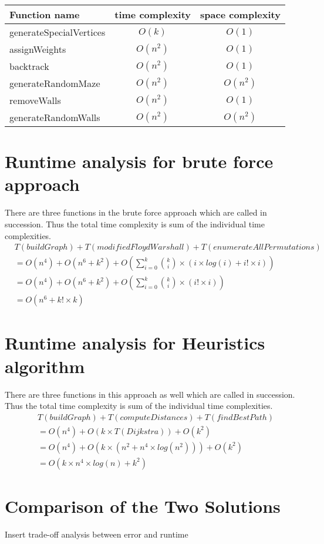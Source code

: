 \documentclass[12pt]{report}
\begin{document}
\begin{center}
\begin{tabular}{ |l||c|c| } 
 \hline
 Function name & time complexity &space complexity \\ 
 \hline\hline
 generateSpecialVertices & $O(k)$  & $O(1)$\\
 \hline
 assignWeights & $O(n^2)$& $O(1)$\\ 
 \hline
 backtrack & $O(n^2)$  & $O(1)$\\
 \hline
 generateRandomMaze & $O(n^2)$ & $O(n^2)$ \\ 
 \hline
 removeWalls & $O(n^2)$ & $O(1)$\\ %
 \hline
 generateRandomWalls & $O(n^2)$ & $O(n^2)$ \\ %
 \hline
 
\end{tabular}
\end{center}


\section{Runtime analysis for brute force approach}
There are three functions in the brute force approach which are called in succession. Thus the total time complexity is sum of the individual time complexities.
\begin{equation}
\begin{aligned}
    &T({buildGraph}) + T({modifiedFloydWarshall}) + T({enumerateAllPermutations})\\
    &= O(n^4) + O(n^6 + k^2) + O(\sum_{i=0}^{k}{\binom{k}{i}\times(i\times log(i) + i!\times i)})\\
    &= O(n^4) + O(n^6 + k^2) + O(\sum_{i=0}^{k}{\binom{k}{i}\times(i!\times i)})\\
    &= O(n^6 + k! \times k)
\end{aligned}
\end{equation}

\section{Runtime analysis for Heuristics algorithm}
There are three functions in this approach as well which are called in succession. Thus the total time complexity is sum of the individual time complexities.
\begin{equation}
\begin{aligned}
    &T({buildGraph}) + T({computeDistances}) + T({findBestPath})\\
    &= O(n^4) + O(k \times T({Dijkstra})) + O(k^2)\\
    &= O(n^4) + O(k \times (n^2 + n^4 \times log(n^2))) + O(k^2)\\
    &= O(k \times n^4 \times log(n) + k^2)
\end{aligned}
\end{equation}

\section{Comparison of the Two Solutions}
Insert trade-off analysis between error and runtime
\end{document}

